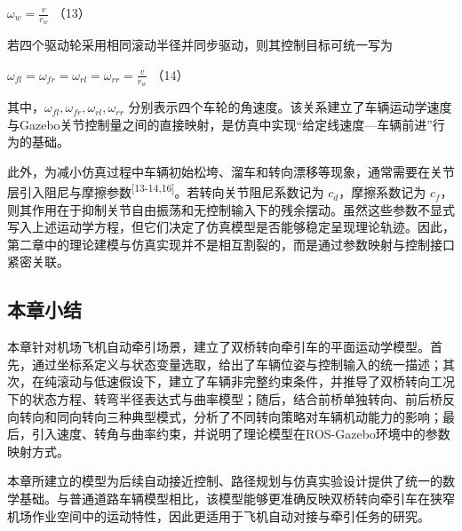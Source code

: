 \(\omega_{w} = \frac{v}{r_{w}}\) （13）

若四个驱动轮采用相同滚动半径并同步驱动，则其控制目标可统一写为

\(\omega_{fl} = \omega_{fr} = \omega_{rl} = \omega_{rr} = \frac{v}{r_{w}}\)
（14）

其中，\(\omega_{fl},\omega_{fr},\omega_{rl},\omega_{rr}\)
分别表示四个车轮的角速度。该关系建立了车辆运动学速度与Gazebo关节控制量之间的直接映射，是仿真中实现``给定线速度---车辆前进''行为的基础。

此外，为减小仿真过程中车辆初始松垮、溜车和转向漂移等现象，通常需要在关节层引入阻尼与摩擦参数\textsuperscript{[13-14,16]}。若转向关节阻尼系数记为
\(c_{d}\)，摩擦系数记为
\(c_{f}\)，则其作用在于抑制关节自由振荡和无控制输入下的残余摆动。虽然这些参数不显式写入上述运动学方程，但它们决定了仿真模型是否能够稳定呈现理论轨迹。因此，第二章中的理论建模与仿真实现并不是相互割裂的，而是通过参数映射与控制接口紧密关联。

\subsection{本章小结}

本章针对机场飞机自动牵引场景，建立了双桥转向牵引车的平面运动学模型。首先，通过坐标系定义与状态变量选取，给出了车辆位姿与控制输入的统一描述；其次，在纯滚动与低速假设下，建立了车辆非完整约束条件，并推导了双桥转向工况下的状态方程、转弯半径表达式与曲率模型；随后，结合前桥单独转向、前后桥反向转向和同向转向三种典型模式，分析了不同转向策略对车辆机动能力的影响；最后，引入速度、转角与曲率约束，并说明了理论模型在ROS-Gazebo环境中的参数映射方式。

本章所建立的模型为后续自动接近控制、路径规划与仿真实验设计提供了统一的数学基础。与普通道路车辆模型相比，该模型能够更准确反映双桥转向牵引车在狭窄机场作业空间中的运动特性，因此更适用于飞机自动对接与牵引任务的研究。\label{_Toc228997183}{}